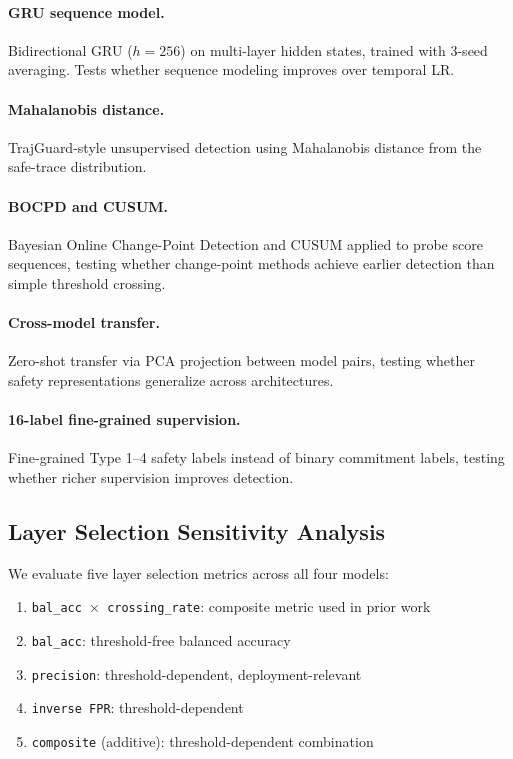 \documentclass[11pt,a4paper]{article}
\begin{document}
\paragraph{GRU sequence model.}
Bidirectional GRU ($h=256$) on multi-layer hidden states, trained with 3-seed averaging.
Tests whether sequence modeling improves over temporal LR.

\paragraph{Mahalanobis distance.}
TrajGuard-style unsupervised detection using Mahalanobis distance from the safe-trace distribution.

\paragraph{BOCPD and CUSUM.}
Bayesian Online Change-Point Detection and CUSUM applied to probe score sequences, testing whether change-point methods achieve earlier detection than simple threshold crossing.

\paragraph{Cross-model transfer.}
Zero-shot transfer via PCA projection between model pairs, testing whether safety representations generalize across architectures.

\paragraph{16-label fine-grained supervision.}
Fine-grained Type 1--4 safety labels instead of binary commitment labels, testing whether richer supervision improves detection.

\subsection{Layer Selection Sensitivity Analysis}
\label{sec:layer-method}

We evaluate five layer selection metrics across all four models:

\begin{enumerate}[nosep,leftmargin=*]
\item \texttt{bal\_acc $\times$ crossing\_rate}: composite metric used in prior work
\item \texttt{bal\_acc}: threshold-free balanced accuracy
\item \texttt{precision}: threshold-dependent, deployment-relevant
\item \texttt{inverse FPR}: threshold-dependent
\item \texttt{composite} (additive): threshold-dependent combination
\end{enumerate}
\end{document}
